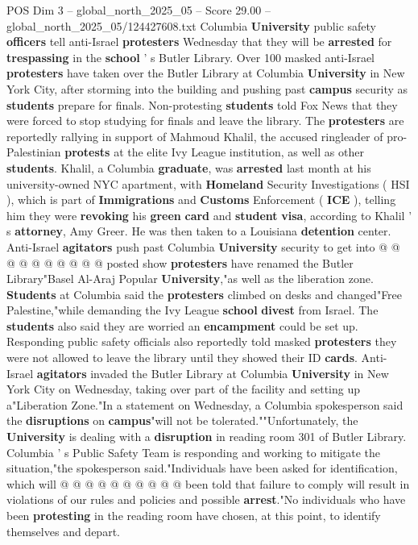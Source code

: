 \begin{textsample}{POS Dim 3 – global\_north\_2025\_05 – Score 29.00 – global\_north\_2025\_05/124427608.txt}  \label{ex:f3_pos_130}
Columbia \textbf{University} public safety \textbf{officers} tell anti-Israel \textbf{protesters} Wednesday that they will be \textbf{arrested} for \textbf{trespassing} in the \textbf{school} ' s Butler Library.
Over 100 masked anti-Israel \textbf{protesters} have taken over the Butler Library at Columbia \textbf{University} in New York City, after storming into the building and pushing past \textbf{campus} security as \textbf{students} prepare for finals.
Non-protesting \textbf{students} told Fox News that they were forced to stop studying for finals and leave the library.
The \textbf{protesters} are reportedly rallying in support of Mahmoud Khalil, the accused ringleader of pro-Palestinian \textbf{protests} at the elite Ivy League institution, as well as other \textbf{students}.
Khalil, a Columbia \textbf{graduate}, was \textbf{arrested} last month at his university-owned NYC apartment, with \textbf{Homeland} Security Investigations ( HSI ), which is part of \textbf{Immigrations} and \textbf{Customs} Enforcement ( \textbf{ICE} ), telling him they were \textbf{revoking} his \textbf{green} \textbf{card} and \textbf{student} \textbf{visa}, according to Khalil ' s \textbf{attorney}, Amy Greer.
He was then taken to a Louisiana \textbf{detention} center.
Anti-Israel \textbf{agitators} push past Columbia \textbf{University} security to get into @ @ @ @ @ @ @ @ @ @ posted show \textbf{protesters} have renamed the Butler Library"Basel Al-Araj Popular \textbf{University},"as well as the liberation zone. \textbf{Students} at Columbia said the \textbf{protesters} climbed on desks and changed"Free Palestine,"while demanding the Ivy League \textbf{school} \textbf{divest} from Israel.
The \textbf{students} also said they are worried an \textbf{encampment} could be set up.
Responding public safety officials also reportedly told masked \textbf{protesters} they were not allowed to leave the library until they showed their ID \textbf{cards}.
Anti-Israel \textbf{agitators} invaded the Butler Library at Columbia \textbf{University} in New York City on Wednesday, taking over part of the facility and setting up a"Liberation Zone."In a statement on Wednesday, a Columbia spokesperson said the \textbf{disruptions} on \textbf{campus}"will not be tolerated.""Unfortunately, the \textbf{University} is dealing with a \textbf{disruption} in reading room 301 of Butler Library.
Columbia ' s Public Safety Team is responding and working to mitigate the situation,"the spokesperson said."Individuals have been asked for identification, which will @ @ @ @ @ @ @ @ @ @ been told that failure to comply will result in violations of our rules and policies and possible \textbf{arrest}."No individuals who have been \textbf{protesting} in the reading room have chosen, at this point, to identify themselves and depart.

\end{textsample}
